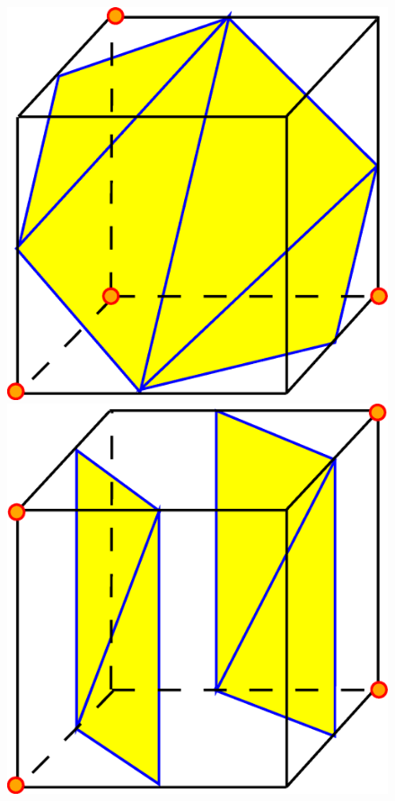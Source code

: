 \begin{figure}[ht]
\includegraphics[scale=0.15]{../img/mar_cub_case9.eps}
\includegraphics[scale=0.15]{../img/mar_cub_case10.eps}

\end{figure}

